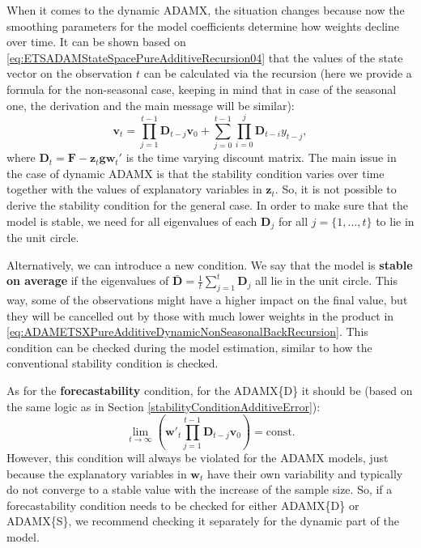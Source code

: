 \documentclass[
]{book}
\theoremstyle{definition}
\theoremstyle{definition}
\theoremstyle{definition}
\theoremstyle{definition}
\theoremstyle{remark}
\begin{document}
When it comes to the dynamic ADAMX, the situation changes because now the smoothing parameters for the model coefficients determine how weights decline over time. It can be shown based on \eqref{eq:ETSADAMStateSpacePureAdditiveRecursion04} that the values of the state vector on the observation \(t\) can be calculated via the recursion (here we provide a formula for the non-seasonal case, keeping in mind that in case of the seasonal one, the derivation and the main message will be similar):
\begin{equation}
  \mathbf{v}_{t} = \prod_{j=1}^{t-1}\mathbf{D}_{t-j} \mathbf{v}_{0} + \sum_{j=0}^{t-1} \prod_{i=0}^{j} \mathbf{D}_{t-i} y_{t-j},
  \label{eq:ADAMETSXPureAdditiveDynamicNonSeasonalBackRecursion}
\end{equation}
where \(\mathbf{D}_t=\mathbf{F} -\mathbf{z}_t \mathbf{g} \mathbf{w}_{t}'\) is the time varying discount matrix. The main issue in the case of dynamic ADAMX is that the stability condition varies over time together with the values of explanatory variables in \(\mathbf{z}_t\). So, it is not possible to derive the stability condition for the general case. In order to make sure that the model is stable, we need for all eigenvalues of each \(\mathbf{D}_{j}\) for all \(j=\{1,\dots,t\}\) to lie in the unit circle.

Alternatively, we can introduce a new condition. We say that the model is \textbf{stable on average} if the eigenvalues of \(\mathbf{\bar{D}}=\frac{1}{t}\sum_{j=1}^t\mathbf{D}_j\) all lie in the unit circle. This way, some of the observations might have a higher impact on the final value, but they will be cancelled out by those with much lower weights in the product in \eqref{eq:ADAMETSXPureAdditiveDynamicNonSeasonalBackRecursion}. This condition can be checked during the model estimation, similar to how the conventional stability condition is checked.

As for the \textbf{forecastability} condition, for the ADAMX\{D\} it should be (based on the same logic as in Section \ref{stabilityConditionAdditiveError}):
\begin{equation}
  \lim\limits_{t\rightarrow\infty}\left(\mathbf{w}'_{t}\prod_{j=1}^{t-1}\mathbf{D}_{t-j} \mathbf{v}_{0}\right) = \text{const} .
  \label{eq:ADAMETSXPureAdditiveDynamicNonSeasonalBackForecastability}
\end{equation}
However, this condition will always be violated for the ADAMX models, just because the explanatory variables in \(\mathbf{w}_{t}\) have their own variability and typically do not converge to a stable value with the increase of the sample size. So, if a forecastability condition needs to be checked for either ADAMX\{D\} or ADAMX\{S\}, we recommend checking it separately for the dynamic part of the model.
\end{document}
